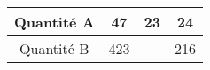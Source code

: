 \begin{tabular}{|c|c|c|c|}
\hline
Quantité A & 47 & 23 & 24 \\ \hline
Quantité B & 423 & \kern1cm & 216 \\ \hline
\end{tabular}

